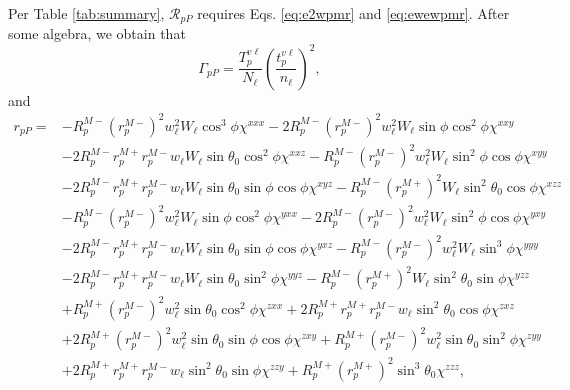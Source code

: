 Per Table \ref{tab:summary}, $\mathcal{R}_{pP}$ requires Eqs. \eqref{eq:e2wpmr}
and \eqref{eq:ewewpmr}. After some algebra, we obtain that
\begin{equation}\label{eq:mc78}
\Gamma_{pP} =
\frac{T^{v\ell}_{p}}{N_{\ell}}
\left(\frac{t^{v\ell}_{p}}{n_{\ell}}\right)^{2}
,
\end{equation}
and
\begin{equation}
\begin{split}
r_{pP} =
&-R^{M-}_{p}\left(r^{M-}_{p}\right)^{2}w^{2}_{\ell}W_{\ell}\cos^{3}\phi
\chi^{xxx}
 -2R^{M-}_{p}\left(r^{M-}_{p}\right)^{2}w^{2}_{\ell}W_{\ell}\sin\phi\cos^{2}\phi
\chi^{xxy}\\
&-2R^{M-}_{p}r^{M+}_{p}r^{M-}_{p}w_{\ell}W_{\ell}\sin\theta_{0}\cos^{2}\phi
\chi^{xxz}
 -R^{M-}_{p}\left(r^{M-}_{p}\right)^{2}w^{2}_{\ell}W_{\ell}\sin^{2}\phi\cos\phi
\chi^{xyy}\\
&-2R^{M-}_{p}r^{M+}_{p}r^{M-}_{p}w_{\ell}W_{\ell}\sin\theta_{0}\sin\phi\cos\phi
\chi^{xyz}
 -R^{M-}_{p}\left(r^{M+}_{p}\right)^{2}W_{\ell}\sin^{2}\theta_{0}\cos\phi
\chi^{xzz}\\
&-R^{M-}_{p}\left(r^{M-}_{p}\right)^{2}w^{2}_{\ell}W_{\ell}\sin\phi\cos^{2}\phi
\chi^{yxx}
 -2R^{M-}_{p}\left(r^{M-}_{p}\right)^{2}w^{2}_{\ell}W_{\ell}\sin^{2}\phi\cos\phi
\chi^{yxy}\\
&-2R^{M-}_{p}r^{M+}_{p}r^{M-}_{p}w_{\ell}W_{\ell}\sin\theta_{0}\sin\phi\cos\phi
\chi^{yxz}
 -R^{M-}_{p}\left(r^{M-}_{p}\right)^{2}w^{2}_{\ell}W_{\ell}\sin^{3}\phi
\chi^{yyy}\\
&-2R^{M-}_{p}r^{M+}_{p}r^{M-}_{p}w_{\ell}W_{\ell}\sin\theta_{0}\sin^{2}\phi
\chi^{yyz}
 -R^{M-}_{p}\left(r^{M+}_{p}\right)^{2}W_{\ell}\sin^{2}\theta_{0}\sin\phi
\chi^{yzz}\\
&+R^{M+}_{p}\left(r^{M-}_{p}\right)^{2}w^{2}_{\ell}\sin\theta_{0}\cos^{2}\phi
\chi^{zxx}
 +2R^{M+}_{p}r^{M+}_{p}r^{M-}_{p}w_{\ell}\sin^{2}\theta_{0}\cos\phi
\chi^{zxz}\\
&+2R^{M+}_{p}\left(r^{M-}_{p}\right)^{2}w^{2}_{\ell}\sin\theta_{0}\sin\phi
\cos\phi\chi^{zxy}
 +R^{M+}_{p}\left(r^{M-}_{p}\right)^{2}w^{2}_{\ell}\sin\theta_{0}\sin^{2}\phi
\chi^{zyy}\\
&+2R^{M+}_{p}r^{M+}_{p}r^{M-}_{p}w_{\ell}\sin^{2}\theta_{0}\sin\phi
\chi^{zzy}
 +R^{M+}_{p}\left(r^{M+}_{p}\right)^{2}\sin^{3}\theta_{0}
\chi^{zzz},
\end{split}
\end{equation}
